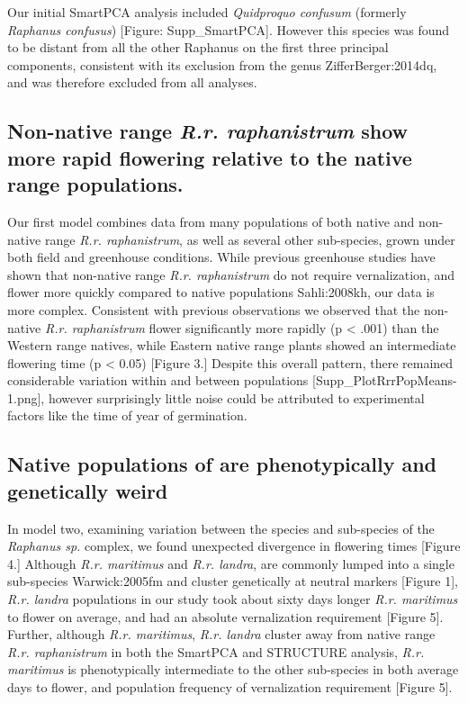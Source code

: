 \documentclass[twocolumn]{bmcart}%
\begin{document}
Our initial SmartPCA analysis included \textit{Quidproquo confusum} (formerly \textit{Raphanus confusus}) [Figure: Supp\_SmartPCA]. However this species was found to be distant from all the other Raphanus on the first three principal components, consistent with its exclusion from the genus {ZifferBerger:2014dq}, and was therefore excluded from all analyses.

\subsection*{Non-native range \textit{R.r. raphanistrum} show more rapid flowering relative to the native range populations.}

Our first model combines data from many populations of both native and non-native range \textit{R.r. raphanistrum}, as well as several other sub-species, grown under both field and greenhouse conditions. While previous greenhouse studies have shown that non-native range \textit{R.r. raphanistrum} do not require vernalization, and flower more quickly compared to native populations {Sahli:2008kh}, our data is more complex. Consistent with previous observations we observed that the non-native \textit{R.r. raphanistrum} flower significantly more rapidly (p < .001) than the Western range natives, while Eastern native range plants showed an intermediate flowering time (p < 0.05) [Figure 3.] Despite this overall pattern, there remained considerable variation within and between populations [Supp\_PlotRrrPopMeans-1.png], however surprisingly little noise could be attributed to experimental factors like the time of year of germination.
%
%
%

\subsection*{Native populations of are phenotypically and genetically weird}

In model two, examining variation between the species and sub-species of the \textit{Raphanus sp.} complex, we found unexpected divergence in flowering times [Figure 4.] Although \textit{R.r. maritimus} and \textit{R.r. landra}, are commonly lumped into a single sub-species {Warwick:2005fm} and cluster genetically at neutral markers [Figure 1], \textit{R.r. landra} populations in our study took about sixty days longer \textit{R.r. maritimus} to flower on average, and had an absolute vernalization requirement [Figure 5]. Further, although \textit{R.r. maritimus}, \textit{R.r. landra} cluster away from native range \textit{R.r. raphanistrum} in both the SmartPCA and STRUCTURE analysis, \textit{R.r. maritimus} is phenotypically intermediate to the other sub-species in both average days to flower, and population frequency of vernalization requirement [Figure 5].
\end{document}
